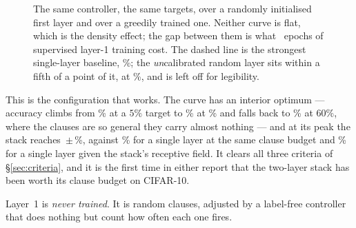 \begin{figure}[h]
\centering
{}
\caption{The same controller, the same targets, over a randomly initialised first layer and
over a greedily trained one. Neither curve is flat, which is the density effect; the gap
between them is what \epochsRun\ epochs of supervised layer-1 training cost. The dashed line
is the strongest single-layer baseline, \accSingleRf{}\%; the \emph{un}calibrated random layer
sits within a fifth of a point of it, at \accMctmRandom{}\%, and is left off for legibility.}
\label{fig:randcalib}
\end{figure}

\begin{ttkey}
This is the configuration that works. The curve has an interior optimum --- accuracy climbs
from \accMctmRcRZeroFive{}\% at a $5\%$ target to \randBestAcc{}\% at \randBestTarget{}\% and
falls back to \accMctmRcRSixZero{}\% at $60\%$, where the clauses are so general they carry
almost nothing --- and at its peak the stack reaches
\randBestAcc\,$\pm$\,\randBestSd{}\%, against \accSingleMatched{}\% for a single layer at the
same clause budget and \accSingleRf{}\% for a single layer given the stack's receptive field.
It clears all three criteria of \S\ref{sec:criteria}, and it is the first time in either
report that the two-layer stack has been worth its clause budget on CIFAR-10.

Layer~1 is \emph{never trained}. It is random clauses, adjusted by a label-free controller that
does nothing but count how often each one fires.
\end{ttkey}

